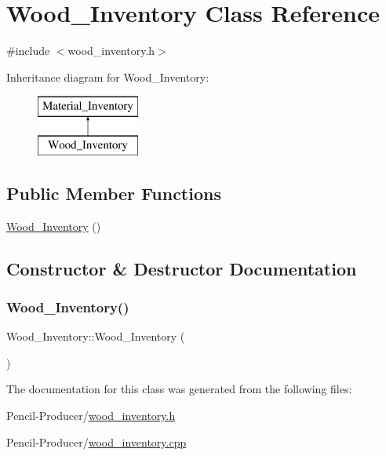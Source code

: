 \hypertarget{classWood__Inventory}{}\section{Wood\+\_\+\+Inventory Class Reference}
\label{classWood__Inventory}


{\ttfamily \#include $<$wood\+\_\+inventory.\+h$>$}

Inheritance diagram for Wood\+\_\+\+Inventory\+:\begin{figure}[H]
\begin{center}
\leavevmode
\includegraphics[height=2.000000cm]{classWood__Inventory}
\end{center}
\end{figure}
\subsection*{Public Member Functions}
\begin{DoxyCompactItemize}
\item 
\mbox{\hyperlink{classWood__Inventory_afcf1c5469106083ce0ab7a7ee5e15523}{Wood\+\_\+\+Inventory}} ()
\end{DoxyCompactItemize}


\subsection{Constructor \& Destructor Documentation}
\mbox{\label{classWood__Inventory_afcf1c5469106083ce0ab7a7ee5e15523}} 
\subsubsection{\texorpdfstring{Wood\_Inventory()}{Wood\_Inventory()}}
{\footnotesize\ttfamily Wood\+\_\+\+Inventory\+::\+Wood\+\_\+\+Inventory (\begin{DoxyParamCaption}{ }\end{DoxyParamCaption})}



The documentation for this class was generated from the following files\+:\begin{DoxyCompactItemize}
\item 
Pencil-\/\+Producer/\mbox{\hyperlink{wood__inventory_8h}{wood\+\_\+inventory.\+h}}\item 
Pencil-\/\+Producer/\mbox{\hyperlink{wood__inventory_8cpp}{wood\+\_\+inventory.\+cpp}}\end{DoxyCompactItemize}
